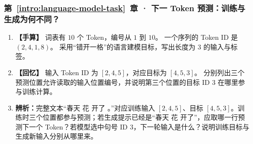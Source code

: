 \subsubsection*{第~\ref*{intro:language-model-task}~章 · 下一 Token 预测：训练与生成为何不同？}
\begin{enumerate}[label={},leftmargin=4.8em,itemsep=4pt]
\item[\textbf{C-041.}] \leavevmode{}\label{exercise:C-041}\label{exercise:shifted-token-targets}\textbf{【手算】} 词表有 $10$ 个 Token，编号从 $1$ 到 $10$。
一个序列的 Token ID 是 $(2,4,1,8)$。
采用“错开一格”的语言建模目标，写出长度为 $3$ 的输入与标签。
\item[\textbf{C-042.}] \leavevmode{}\label{exercise:C-042}\label{exercise:causal-target-visibility}\textbf{【回忆】} 输入 Token ID 为 $[2,4,5]$，对应目标为 $[4,5,3]$。
分别列出三个预测位置允许读取的输入位置编号，并说明第三个位置的目标 ID $3$ 在哪里参与训练计算。
\item[\textbf{C-043.}] \leavevmode{}\label{exercise:C-043}\label{exercise:training-generation-data}\textbf{辨析：}完整文本“春天 花 开了 。”对应训练输入 $[2,4,5]$、目标 $[4,5,3]$。训练时三个位置都参与预测；若生成提示已经是“春天 花 开了”，应取哪一行预测下一个 Token？若模型选中句号 ID $3$，下一轮输入是什么？说明训练目标与生成新输入分别从哪里来。
\end{enumerate}
